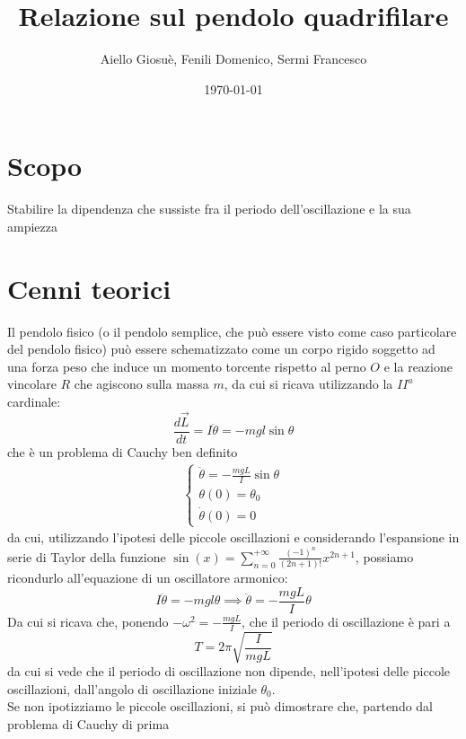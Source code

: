 \documentclass{article}
\title{Relazione sul pendolo quadrifilare}
\author{Aiello Giosuè, Fenili Domenico, Sermi Francesco}
\date{\today}
\begin{document}
	\maketitle
	\newpage
	\tableofcontents
	\newpage
	\section{Scopo}
		Stabilire la dipendenza che sussiste fra il periodo dell'oscillazione e la sua ampiezza
	\section{Cenni teorici}
	Il pendolo fisico (o il pendolo semplice, che può essere visto come caso particolare del pendolo fisico) può essere schematizzato come un corpo rigido soggetto ad una forza peso che induce un momento torcente rispetto al perno $O$ e la reazione vincolare $R$ che agiscono sulla massa $m$, da cui si ricava utilizzando la $II^a$ cardinale:
	\begin{equation}
		\frac{d\vec{L}}{dt} = I\ddot{\theta} = -mgl\sin{\theta}
	\end{equation}
	che è un problema di Cauchy ben definito
	\begin{align}
		\begin{cases*}
			\ddot{\theta} = - \frac{mgL}{I} \sin{\theta} \\
			\theta(0) = \theta_0 \\
			\dot{\theta}(0) = 0
		\end{cases*}
	\end{align}
	da cui, utilizzando l'ipotesi delle piccole oscillazioni e considerando l'espansione in serie di Taylor della funzione $\sin{(x)} = \sum\limits_{n=0}^{+\infty} \frac{(-1)^n}{(2n+1)!} x^{2n+1}$, possiamo ricondurlo all'equazione di un oscillatore armonico:
	\begin{equation}
		I\ddot{\theta} = -mgl\theta \implies \ddot\theta = -\frac{mgL}{I}\theta
	\end{equation}
	Da cui si ricava che, ponendo $-\omega^2 = -\frac{mgL}{I}$, che il periodo di oscillazione è pari a
	\begin{equation}
		T = 2\pi \sqrt{\frac{I}{mgL}}
	\end{equation}
	da cui si vede che il periodo di oscillazione non dipende, nell'ipotesi delle piccole oscillazioni, dall'angolo di oscillazione iniziale $\theta_0$. \\	
	Se non ipotizziamo le piccole oscillazioni, si può dimostrare che, partendo dal problema di Cauchy di prima
\end{document}
